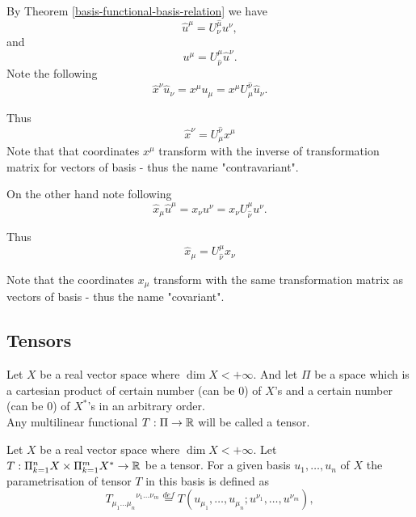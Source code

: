 \documentclass[main.tex]{subfiles}
\begin{document}
By Theorem \ref{basis-functional-basis-relation} we have
\begin{equation}
\hat{u}^\mu =  U^{\hat{\mu}}_{\nu} u^\nu,
\end{equation}
and 
\begin{equation}
u^\mu = U^{\mu}_{\hat{\nu}} \hat{u}^\nu.
\end{equation}
Note the following
\begin{equation}
\hat{x}^\nu \hat{u}_\nu = x^\mu u_\mu = x^\mu U^{\hat{\nu}}_\mu  \hat{u}_\nu.
\end{equation}

Thus
\begin{equation}
\label{u-contravariant}
\boxed{
\hat{x}^\nu = U^{\hat{\nu}}_\mu x^\mu 
}
\end{equation}
Note that that coordinates $x^\mu$ transform with the inverse of transformation matrix for vectors of basis - thus the name "contravariant".

On the other hand note following
\begin{equation}
\hat{x}_\mu \hat{u}^\mu = x_\nu u^\nu = x_\nu U^{\mu}_{\hat{\nu}} u^\nu.
\end{equation}

Thus
\begin{equation}
\boxed{
\hat{x}_\mu = U^{\mu}_{\hat{\nu}} x_\nu}
\end{equation}

Note that the coordinates $x_\mu$ transform with the same transformation matrix as vectors of basis - thus the name "covariant".

\subsection{Tensors}

\begin{definition}
Let $X$ be a real vector space where $\dim X < +\infty$. And let $\Pi$ be a space which is a cartesian product of certain number (can be 0) of $X$'s and a certain number (can be 0) of $X^*$'s in an arbitrary order.\\

\noindent
Any multilinear functional $T:\Pi\to\mathbb{R}$ will be called a tensor. 
\end{definition}

Let $X$ be a real vector space where $\dim X < +\infty$.
Let $T:\Pi_{k=1}^n X \times \Pi_{k=1}^m X^*\to\mathbb{R}$ be a tensor. For a given basis $u_1, \dots, u_n$ of $X$ the parametrisation of tensor $T$ in this basis is defined as
\begin{equation}
\label{tensor-parametrisation}
{T_{\mu_1\dots\mu_n}}^{\nu_1\dots\nu_m} \stackrel{def}{=} 
T(u_{\mu_1}, \dots, u_{\mu_n}; u^{\nu_1}, \dots, u^{\nu_m}),
\end{equation} 
\end{document}
